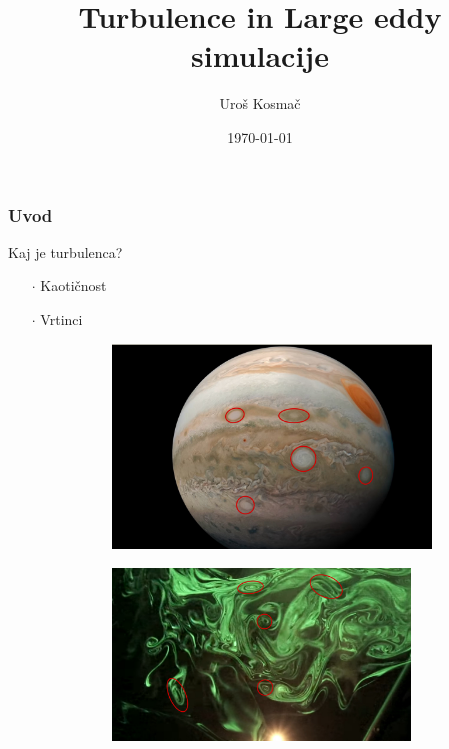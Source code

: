 \documentclass{beamer}
\title[Long title]{Turbulence in Large eddy simulacije} %
\author{Uroš Kosmač} %
\institute[FMF] %
{
Fakulteta za matematiko in fiziko\\ %
\textit{Mentor: prof. dr. Emil Žagar}\\ %
\textit{Somentor: dr. Peter Smerkol} %
}
\date{\today} %
\begin{document}
\begin{frame}
\titlepage %
\end{frame}

    

\begin{frame}
\frametitle{Uvod}
Kaj je turbulenca? \\
\pause
\begin{itemize}
    \item[\Large$\cdot$] Kaotičnost
    \pause
    \item[\Large$\cdot$] Vrtinci 
    \begin{figure}[h!]
        \centering
        \begin{subfigure}{.5\textwidth}
          \centering
          \includegraphics[width=0.95\linewidth]{slike/vrtinci.jpeg}
        \end{subfigure}%
        \begin{subfigure}{.5\textwidth}
          \centering
          \includegraphics[height=4.58cm, width=0.95\linewidth]{slike/vrtinci2.jpeg}
        \end{subfigure}
        \end{figure}
\end{itemize}
\end{frame}
\end{document}
